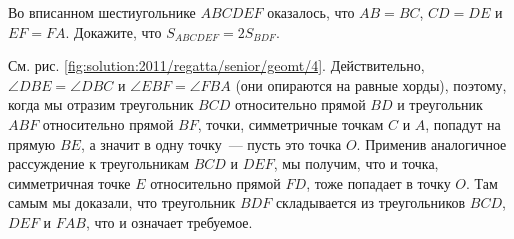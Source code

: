 Во вписанном шестиугольнике $ABCDEF$ оказалось, что
$AB = BC$, $CD = DE$ и $EF = FA$.
Докажите, что $S_{ABCDEF} = 2 S_{BDF}$.

%
\label{solution:2011/regatta/senior/geomt/4}%
См. рис. \ref{fig:solution:2011/regatta/senior/geomt/4}.
Действительно, $\angle DBE = \angle DBC$ и $\angle EBF = \angle FBA$
(они опираются на равные хорды),
поэтому, когда мы отразим треугольник $BCD$ относительно прямой $BD$ и
треугольник $ABF$ относительно прямой $BF$, точки, симметричные точкам $C$ и
$A$, попадут на прямую $BE$, а значит в одну точку~--- пусть это точка $O$.
Применив аналогичное рассуждение к треугольникам $BCD$ и $DEF$, мы получим, что
и точка, симметричная точке $E$ относительно прямой $FD$, тоже попадает в точку
$O$.
Там самым мы доказали, что треугольник $BDF$ складывается из треугольников
$BCD$, $DEF$ и $FAB$, что и означает требуемое.

